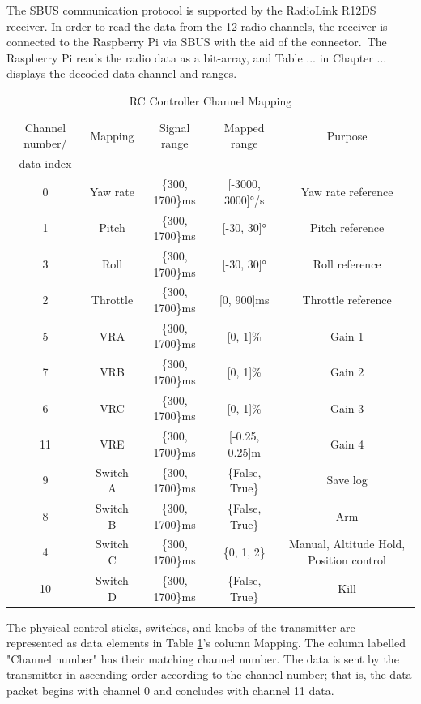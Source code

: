 \documentclass{article}
\begin{document}
The SBUS communication protocol is supported by the RadioLink R12DS receiver. In order to read the data from the 12 radio channels, the receiver is connected to the Raspberry Pi via SBUS with the aid of the connector. The Raspberry Pi reads the radio data as a bit-array, and Table ... in Chapter ... 
displays the decoded data channel and ranges.

\begin{table}[h]
  \centering
  \begin{tabular}{|c|c|c|c|c|}
    \hline
    Channel number/ & Mapping & Signal range & Mapped range & Purpose \\
    data index & & & & \\
    \hline
    0 & Yaw rate & \{300, 1700\}ms & [-3000, 3000]°/s & Yaw rate reference \\
    1 & Pitch & \{300, 1700\}ms & [-30, 30]° & Pitch reference \\
    3 & Roll & \{300, 1700\}ms & [-30, 30]° & Roll reference \\
    2 & Throttle & \{300, 1700\}ms & [0, 900]ms & Throttle reference \\
    5 & VRA & \{300, 1700\}ms & [0, 1]\% & Gain 1 \\
    7 & VRB & \{300, 1700\}ms & [0, 1]\% & Gain 2 \\
    6 & VRC & \{300, 1700\}ms & [0, 1]\% & Gain 3 \\
    11 & VRE & \{300, 1700\}ms & [-0.25, 0.25]m & Gain 4 \\
    9 & Switch A & \{300, 1700\}ms & \{False, True\} & Save log \\
    8 & Switch B & \{300, 1700\}ms & \{False, True\} & Arm \\
    4 & Switch C & \{300, 1700\}ms & \{0, 1, 2\} & Manual, Altitude Hold, Position control \\
    10 & Switch D & \{300, 1700\}ms & \{False, True\} & Kill \\
    \hline
  \end{tabular}
  \caption{RC Controller Channel Mapping}
  \label{figure:RC_Controller_Channel_Mapping}
\end{table}

The physical control sticks, switches, and knobs of the transmitter are represented as data elements in Table \ref{figure:RC_Controller_Channel_Mapping}'s column Mapping. The column labelled "Channel number" has their matching channel number. The data is sent by the transmitter in ascending order according to the channel number; that is, the data packet begins with channel 0 and concludes with channel 11 data.
\end{document}
